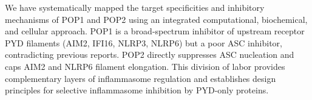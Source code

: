 \documentclass[11pt]{article}
\begin{document}
We have systematically mapped the target specificities and inhibitory mechanisms of POP1 and POP2 using an integrated computational, biochemical, and cellular approach. POP1 is a broad-spectrum inhibitor of upstream receptor PYD filaments (AIM2, IFI16, NLRP3, NLRP6) but a poor ASC inhibitor, contradicting previous reports. POP2 directly suppresses ASC nucleation and caps AIM2 and NLRP6 filament elongation. This division of labor provides complementary layers of inflammasome regulation and establishes design principles for selective inflammasome inhibition by PYD-only proteins.



\end{document}
